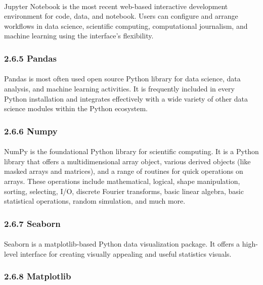 \documentclass[runningheads]{llncs}
\begin{document}
\paragraph{}
Jupyter Notebook is the most recent web-based interactive development environment for code, data, and notebook. Users can configure and arrange workflows in data science, scientific computing, computational journalism, and machine learning using the interface's flexibility.

\subsubsection{2.6.5 Pandas}
\paragraph{}
Pandas is most often used open source Python library for data science, data analysis, and machine learning activities. It is frequently included in every Python installation and integrates effectively with a wide variety of other data science modules within the Python ecosystem.

\subsubsection{2.6.6 Numpy}
\paragraph{}
NumPy is the foundational Python library for scientific computing. It is a Python library that offers a multidimensional array object, various derived objects (like masked arrays and matrices), and a range of routines for quick operations on arrays. These operations include mathematical, logical, shape manipulation, sorting, selecting, I/O, discrete Fourier transforms, basic linear algebra, basic statistical operations, random simulation, and much more.

\subsubsection{2.6.7 Seaborn}
\paragraph{}
Seaborn is a matplotlib-based Python data visualization package. It offers a high-level interface for creating visually appealing and useful statistics visuals.

\subsubsection{2.6.8 Matplotlib}
\end{document}
